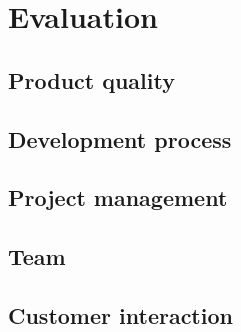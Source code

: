 
\chapter{Evaluation}

\section{Product quality}

\section{Development process}

\section{Project management}

\section{Team}

\section{Customer interaction}

\cleardoublepage